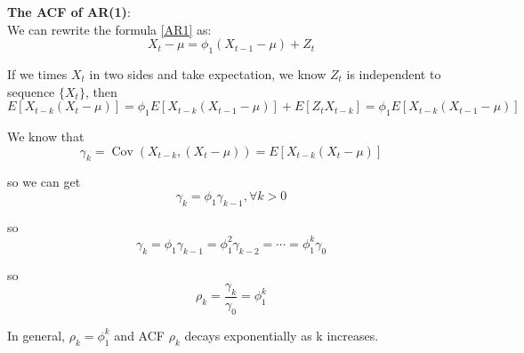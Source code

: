 \documentclass{article}
\begin{document}
\noindent \textbf{The ACF of AR(1)}: \\

\noindent We can rewrite the formula \eqref{AR1} as:
\begin{equation*}
X_{t}-\mu=\phi_{1}\left(X_{t-1}-\mu\right)+Z_{t}
\end{equation*}

\noindent If we times $X_t$ in two sides and take expectation, we know $Z_t$ is independent to sequence $\{X_t\}$, then
\begin{equation*}
E\left[X_{t-k}\left(X_{t}-\mu\right)\right]=\phi_{1} E\left[X_{t-k}\left(X_{t-1}-\mu\right)\right]+E\left[Z_tX_{t-k}\right]=\phi_{1} E\left[X_{t-k}\left(X_{t-1}-\mu\right)\right]
\end{equation*}

\noindent We know that
\begin{equation*}
\gamma_k = \operatorname{Cov}\left(X_{t-k}, (X_{t} - \mu)\right) = E\left[X_{t-k}\left(X_{t}-\mu\right)\right]
\end{equation*}

\noindent so we can get
\begin{equation*}
\gamma_k = \phi_{1}\gamma_{k-1}, \forall k>0
\end{equation*}

\noindent so
\begin{equation*}
\gamma_{k}=\phi_1 \gamma_{k-1}=\phi_1^{2} \gamma_{k-2}=\cdots=\phi_1^{k} \gamma_{0}
\end{equation*}

\noindent so
\begin{equation*}
\rho_{k}=\frac{\gamma_{k}}{\gamma_{0}}=\phi_1^{k}
\end{equation*}

\noindent In general, $\rho_k = \phi_1^k$ and ACF $\rho_k$ decays exponentially as k increases. \\
\end{document}
